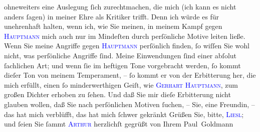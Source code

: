                ohneweiters eine Auslegung ſich zurechtmachen, die mich (ich kann es nicht anders
               ſagen) in meiner  Ehre als Kritiker trifft. Denn ich würde es für
               unehrenhaft halten, wenn ich, wie Sie meinen, in meinem Kampf gegen \textsc{\textcolor{blue}{Hauptmann}{}\ledrightnote{\textcolor{blue}{Gerhart Hauptmann}}} mich auch nur im Mindeſten durch perſönliche Motive leiten ließe. Wenn Sie
               meine Angriffe gegen \textsc{\textcolor{blue}{Hauptmann}{}\ledrightnote{\textcolor{blue}{Gerhart Hauptmann}}} perſönlich {\pb}finden, ſo wiſſen Sie wohl nicht,
               was perſönliche Angriffe ſind. Meine Einwendungen ſind einer abſolut ſachlichen Art;
               und wenn ſie im heftigen Tone vorgebracht werden, ſo kommt dieſer Ton von meinem
               Temperament, – ſo kommt er von der Erbitterung her, die mich erfüllt, einen ſo
               minderwerthigen Geiſt, wie \textsc{\textcolor{blue}{Gerhart Hauptmann}{}\ledrightnote{\textcolor{blue}{Gerhart Hauptmann}}}, zum großen Dichter erhoben zu ſehen. Und daß Sie mir dieſe Erbitterung nicht
               glauben wollen, daß Sie nach perſönlichen Motiven ſuchen, – Sie, eine Freundin, – das
               hat mich verblüfft, das hat mich ſchwer gekränkt{\dotsfive}\pend
           \pstart Grüßen Sie, bitte, \textsc{\textcolor{blue}{Liesl}{}\ledrightnote{\textcolor{blue}{Elisabeth Steinrück}}}; und ſeien Sie ſammt \textsc{\textcolor{blue}{Arthur}{}\ledrightnote{}} herzlichſt gegrüßt von Ihrem \spacefill\mbox{Paul Goldmann}\pend{}\endnumbering{}  
      